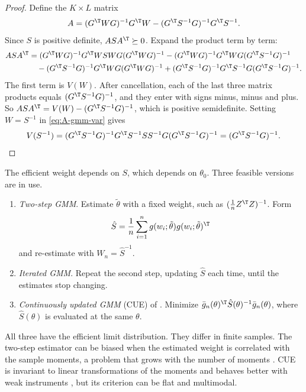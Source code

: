 \begin{proof}
Define the $K \times L$ matrix
\begin{equation*}
  A = (G^\T WG)^{-1}G^\T W - (G^\T S^{-1}G)^{-1}G^\T S^{-1}.
\end{equation*}
Since $S$ is positive definite, $ASA^\T \succeq 0$. Expand the product term by term:
\begin{align*}
  ASA^\T &= (G^\T WG)^{-1}G^\T WSWG(G^\T WG)^{-1}
  - (G^\T WG)^{-1}G^\T WG(G^\T S^{-1}G)^{-1} \\
  &\quad - (G^\T S^{-1}G)^{-1}G^\T WG(G^\T WG)^{-1}
  + (G^\T S^{-1}G)^{-1}G^\T S^{-1}G(G^\T S^{-1}G)^{-1}.
\end{align*}
The first term is $V(W)$. After cancellation, each of the last three matrix products equals $(G^\T S^{-1}G)^{-1}$, and
they enter with signs minus, minus and plus. So $ASA^\T = V(W) - (G^\T S^{-1}G)^{-1}$, which is positive semidefinite.
Setting $W = S^{-1}$ in \eqref{eq:A-gmm-var} gives
\begin{equation*}
  V(S^{-1}) = (G^\T S^{-1}G)^{-1}G^\T S^{-1}SS^{-1}G(G^\T S^{-1}G)^{-1} = (G^\T S^{-1}G)^{-1}. \qedhere
\end{equation*}
\end{proof}

The efficient weight depends on $S$, which depends on $\theta_0$. Three feasible versions are in use.
\begin{enumerate}
  \item \emph{Two-step GMM}. Estimate $\tilde\theta$ with a fixed weight, such as $(\frac{1}{n}Z^\T Z)^{-1}$. Form
  \begin{equation*}
    \hat S = \frac{1}{n}\sum_{i=1}^ng(w_i;\tilde\theta)g(w_i;\tilde\theta)^\T
  \end{equation*}
  and re-estimate with $W_n = \hat S^{-1}$.
  \item \emph{Iterated GMM}. Repeat the second step, updating $\hat S$ each time, until the estimates stop changing.
  \item \emph{Continuously updated GMM} (CUE) of \citet{HansenHeatonYaron1996}. Minimize
  $\bar g_n(\theta)^\T\hat S(\theta)^{-1}\bar g_n(\theta)$, where $\hat S(\theta)$ is evaluated at the same $\theta$.
\end{enumerate}
All three have the efficient limit distribution. They differ in finite samples. The two-step estimator can be biased when
the estimated weight is correlated with the sample moments, a problem that grows with the number of moments
\citep{AltonjiSegal1996}. CUE is invariant to linear transformations of the moments and behaves better with weak
instruments \citep{HansenHeatonYaron1996, StockWright2000}, but its criterion can be flat and multimodal.

